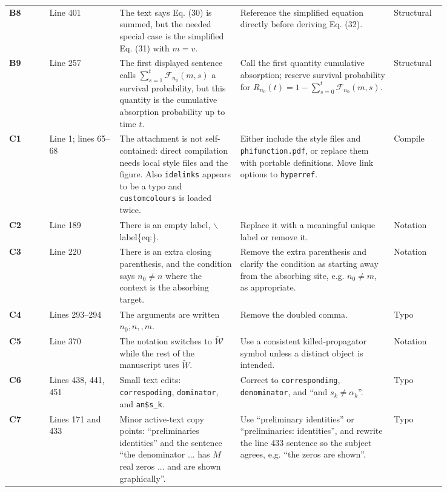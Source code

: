 \documentclass[11pt]{article}
\newcommand{\wt}{\widetilde}
\newcommand{\Fcal}{\mathcal{F}}
\newcommand{\issue}[1]{\textbf{#1}}
\newcommand{\code}[1]{\texttt{#1}}
\begin{document}
\begin{longtable}{@{}L{0.08\linewidth}L{0.14\linewidth}L{0.24\linewidth}L{0.28\linewidth}L{0.10\linewidth}@{}}
\issue{B8} & Line 401 &
The text says Eq. (30) is summed, but the needed special case is the simplified
Eq. (31) with \(m=v\). &
Reference the simplified equation directly before deriving Eq. (32). &
\textcolor{struct}{Structural}\\

\issue{B9} & Line 257 &
The first displayed sentence calls \(\sum_{s=1}^t\Fcal_{n_0}(m,s)\) a survival
probability, but this quantity is the cumulative absorption probability up to
time \(t\). &
Call the first quantity cumulative absorption; reserve survival probability for
\(R_{n_0}(t)=1-\sum_{s=0}^t\Fcal_{n_0}(m,s)\). &
\textcolor{struct}{Structural}\\

\issue{C1} & Line 1; lines 65--68 &
The attachment is not self-contained: direct compilation needs local
style files and the figure.  Also \code{idelinks} appears to be a typo and
\code{customcolours} is loaded twice. &
Either include the style files and \code{phifunction.pdf}, or replace them with
portable definitions.  Move link options to \code{hyperref}. &
\textcolor{minor}{Compile}\\

\issue{C2} & Line 189 &
There is an empty label, \(\backslash\)label\{eq:\}. &
Replace it with a meaningful unique label or remove it. &
\textcolor{minor}{Notation}\\

\issue{C3} & Line 220 &
There is an extra closing parenthesis, and the condition says \(n_0\neq n\)
where the context is the absorbing target. &
Remove the extra parenthesis and clarify the condition as starting away from
the absorbing site, e.g. \(n_0\neq m\), as appropriate. &
\textcolor{minor}{Notation}\\

\issue{C4} & Lines 293--294 &
The arguments are written \(n_0,n,,m\). &
Remove the doubled comma. &
\textcolor{minor}{Typo}\\

\issue{C5} & Line 370 &
The notation switches to \(\wt{\mathcal W}\) while the rest of the manuscript
uses \(\wt W\). &
Use a consistent killed-propagator symbol unless a distinct object is intended. &
\textcolor{minor}{Notation}\\

\issue{C6} & Lines 438, 441, 451 &
Small text edits: \code{correspoding}, \code{dominator}, and
\code{an\$s\_k}. &
Correct to \code{corresponding}, \code{denominator}, and ``and
\(s_k\neq\alpha_k\)''. &
\textcolor{minor}{Typo}\\

\issue{C7} & Lines 171 and 433 &
Minor active-text copy points: ``preliminaries identities'' and the sentence
``the denominator ... has \(M\) real zeros ... and are shown graphically''. &
Use ``preliminary identities'' or ``preliminaries: identities'', and rewrite
the line 433 sentence so the subject agrees, e.g. ``the zeros are shown''. &
\textcolor{minor}{Typo}\\

\bottomrule
\end{longtable}
\normalsize
\end{document}
